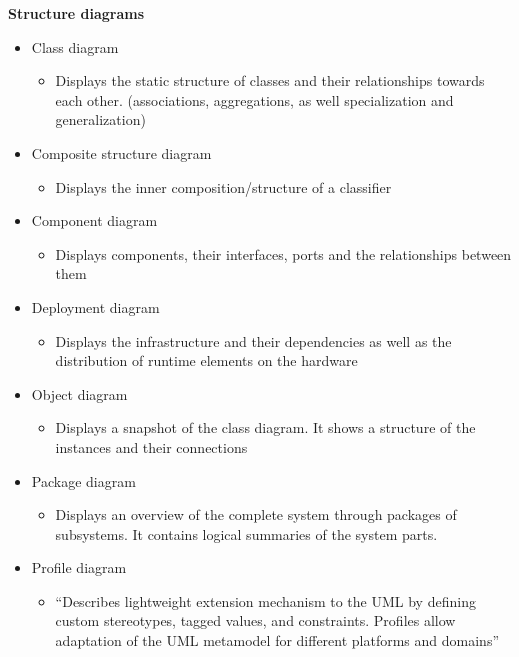 \begin{description}
\item \textbf{Structure diagrams}
\begin{itemize} 
\item Class diagram
    \begin{itemize} 
    \item Displays the static structure of classes and their relationships towards each other. (associations, aggregations, as well specialization and generalization)
    \end{itemize}
\item Composite structure diagram
    \begin{itemize} 
    \item Displays the inner composition/structure of a classifier
    \end{itemize}
\item Component diagram
    \begin{itemize} 
    \item Displays components, their interfaces, ports and the relationships between them
    \end{itemize}
\item Deployment diagram
    \begin{itemize} 
    \item Displays the infrastructure and their dependencies as well as the distribution of runtime elements on the hardware
    \end{itemize}
    \pagebreak
\item Object diagram
    \begin{itemize} 
    \item Displays a snapshot of the class diagram. It shows a structure of the instances and their connections
    \end{itemize}
\item Package diagram
    \begin{itemize} 
    \item Displays an overview of the complete system through packages of subsystems. It contains logical summaries of the system parts.
    \end{itemize}
\item Profile diagram
    \begin{itemize} 
    \item “Describes lightweight extension mechanism to the UML by defining custom stereotypes, tagged values, and constraints. Profiles allow adaptation of the UML metamodel for different platforms and domains”\citep{umldiagrams.org2015_profile}
    \end{itemize}
\end{itemize}
\end{description}

